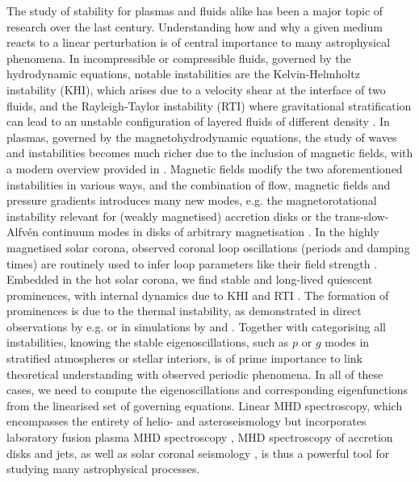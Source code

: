 The study of stability for plasmas and fluids alike has been a major topic of research over the last century. Understanding how and why a given medium reacts to a linear perturbation is of central importance to many astrophysical phenomena. In incompressible or compressible fluids, governed by the hydrodynamic equations, notable instabilities are the Kelvin-Helmholtz instability (KHI), which arises due to a velocity shear at the interface of two fluids, and the Rayleigh-Taylor instability (RTI) where gravitational stratification can lead to an unstable configuration of layered fluids of different density \citep{book_chandrasekhar,book_choudhuri}. In plasmas, governed by the magnetohydrodynamic equations, the study of waves and instabilities becomes much richer due to the inclusion of magnetic fields, with a modern overview provided in \citet{book_MHD}. Magnetic fields modify the two aforementioned instabilities in various ways, and the combination of flow, magnetic fields and pressure gradients introduces many new modes, e.g. the magnetorotational instability \citep{balbus1991} relevant for (weakly magnetised) accretion disks or the trans-slow-Alfv\'en continuum modes in disks of arbitrary magnetisation \citep{goedbloed2004}. In the highly magnetised solar corona, observed coronal loop oscillations (periods and damping times) are routinely used to infer loop parameters like their field strength \citep{nakariakov2001}. Embedded in the hot solar corona, we find stable and long-lived quiescent prominences, with internal dynamics due to KHI \citep{hillier2018_KHI} and RTI \citep{hillier2018_RTI}. The formation of prominences is due to the thermal instability, as demonstrated in direct observations by e.g. \citet{berger2012} or in simulations by \citet{xia2016} and \citet{claes2020}. Together with categorising all instabilities, knowing the stable eigenoscillations, such as $p$ or $g$ modes in stratified atmospheres or stellar interiors, is of prime importance to link theoretical understanding with observed periodic phenomena. In all of these cases, we need to compute the eigenoscillations and corresponding eigenfunctions from the linearised set of governing equations. Linear MHD spectroscopy, which encompasses the entirety of helio- and asteroseismology but incorporates laboratory fusion plasma MHD spectroscopy \citep{goedbloed1993}, MHD spectroscopy of accretion disks \citep{keppens2002} and jets, as well as solar coronal seismology \citep{book_roberts}, is thus a powerful tool for studying many astrophysical processes.

